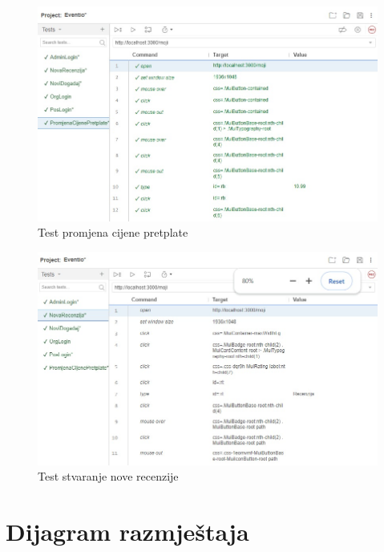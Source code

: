 			\begin{figure}[H]
				\includegraphics[scale=0.45]{testovi/selPretplata.jpeg}
				\centering
				\caption{Test promjena cijene pretplate}
				\label{fig:promjene}
			\end{figure}
			
			\begin{figure}[H]
				\includegraphics[scale=0.45]{testovi/selRecenzija.jpeg}
				\centering
				\caption{Test stvaranje nove recenzije}
				\label{fig:promjene}
			\end{figure}
			
		
		
		\section{Dijagram razmještaja}
			
